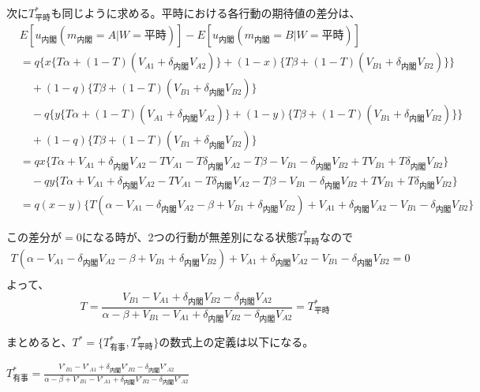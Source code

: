 \documentclass[main.tex]{subfiles}
\begin{document}
次に$T^*_{平時}$も同じように求める。平時における各行動の期待値の差分は、
\begin{align*}
    & E[u_{内閣}(m_{内閣}=A|W=平時)] - E[u_{内閣}(m_{内閣}=B|W=平時)]\\
    & = q\Big\lbrace
        x \lbrace T\alpha + (1-T)(V_{A1} + \delta_{内閣} V_{A2}) \rbrace + (1-x)\lbrace T\beta + (1-T)(V_{B1} + \delta_{内閣} V_{B2}) \rbrace 
        \Big\rbrace\\
    & \quad +(1-q)\lbrace T\beta + (1-T)(V_{B1} + \delta_{内閣} V_{B2}) \rbrace\\
    & \quad - q\Big\lbrace
        y \lbrace T\alpha + (1-T)(V_{A1} + \delta_{内閣} V_{A2}) \rbrace + (1-y)\lbrace T\beta + (1-T)(V_{B1} + \delta_{内閣} V_{B2}) \rbrace
        \Big\rbrace\\
    & \quad +(1-q)\lbrace T\beta + (1-T)(V_{B1} + \delta_{内閣} V_{B2}) \rbrace\\
    & = qx \lbrace T\alpha + V_{A1} + \delta_{内閣}V_{A2} - TV_{A1} - T\delta_{内閣}V_{A2} - T\beta -V_{B1} -\delta_{内閣}V_{B2} + TV_{B1} + T\delta_{内閣}V_{B2} \rbrace\\
    & \quad -qy\lbrace T\alpha + V_{A1} + \delta_{内閣}V_{A2} - TV_{A1} - T\delta_{内閣}V_{A2} - T\beta -V_{B1} -\delta_{内閣}V_{B2} + TV_{B1} + T\delta_{内閣}V_{B2} \rbrace\\
    & = q(x-y)\lbrace T(\alpha -V_{A1} -\delta_{内閣}V_{A2} - \beta + V_{B1} + \delta_{内閣}V_{B2}) + V_{A1} + \delta_{内閣}V_{A2} - V_{B1} - \delta_{内閣}V_{B2}  \rbrace
\end{align*}

\noindent
この差分が$=0$になる時が、2つの行動が無差別になる状態$T^*_{平時}$なので
\begin{gather*}
    T(\alpha -V_{A1} -\delta_{内閣}V_{A2} - \beta + V_{B1} + \delta_{内閣}V_{B2}) + V_{A1} + \delta_{内閣}V_{A2} - V_{B1} - \delta_{内閣}V_{B2} = 0\\
\end{gather*}
よって、
$$T = \frac{ V_{B1} - V_{A1} +\delta_{内閣}V_{B2} - \delta_{内閣}V_{A2} }{ \alpha-\beta + V_{B1}-V_{A1} + \delta_{内閣}V_{B2} - \delta_{内閣}V_{A2} }
= T^*_{平時}$$


まとめると、$T^* = \lbrace T^*_{有事}, T^*_{平時} \rbrace$の数式上の定義は以下になる。

\vspace{0.5\baselineskip}

\begin{definition} \Large$T^*_{有事} = \frac{ V'_{B1} - V'_{A1} +\delta_{内閣}V'_{B2} - \delta_{内閣}V'_{A2} }{ \alpha-\beta + V'_{B1}-V'_{A1} + \delta_{内閣}V'_{B2} - \delta_{内閣}V'_{A2} }$ \end{definition}
\end{document}

